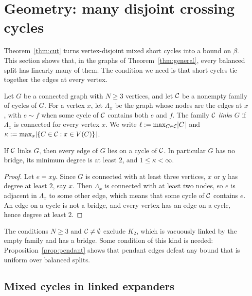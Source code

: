 \section{Geometry: many disjoint crossing cycles}\label{sec:geometry}

Theorem~\ref{thm:cut} turns vertex-disjoint mixed short cycles into a bound on $\beta$. This section shows that, in the graphs of Theorem~\ref{thm:general}, every balanced split has linearly many of them. The condition we need is that short cycles tie together the edges at every vertex.

\begin{definition}\label{def:linked}
Let $G$ be a connected graph with $N\ge3$ vertices, and let $\mathcal{C}$ be a nonempty family of cycles of $G$. For a vertex $x$, let $\Lambda_x$ be the graph whose nodes are the edges at $x$, with $e\sim f$ when some cycle of $\mathcal{C}$ contains both $e$ and $f$. The family $\mathcal{C}$ \emph{links} $G$ if $\Lambda_x$ is connected for every vertex $x$. We write $\ell:=\max_{C\in\mathcal{C}}\lvert C\rvert$ and $\kappa:=\max_x\lvert \{C\in\mathcal{C}:x\in V(C)\}\rvert$.
\end{definition}

\begin{lemma}\label{lem:linked-basic}
If $\mathcal{C}$ links $G$, then every edge of $G$ lies on a cycle of $\mathcal{C}$. In particular $G$ has no bridge, its minimum degree is at least $2$, and $1\le\kappa<\infty$.
\end{lemma}

\begin{proof}
Let $e=xy$. Since $G$ is connected with at least three vertices, $x$ or $y$ has degree at least $2$, say $x$. Then $\Lambda_x$ is connected with at least two nodes, so $e$ is adjacent in $\Lambda_x$ to some other edge, which means that some cycle of $\mathcal{C}$ contains $e$. An edge on a cycle is not a bridge, and every vertex has an edge on a cycle, hence degree at least $2$.
\end{proof}

The conditions $N\ge3$ and $\mathcal{C}\ne\emptyset$ exclude $K_2$, which is vacuously linked by the empty family and has a bridge. Some condition of this kind is needed: Proposition~\ref{prop:pendant} shows that pendant edges defeat any bound that is uniform over balanced splits.

\subsection{Mixed cycles in linked expanders}

